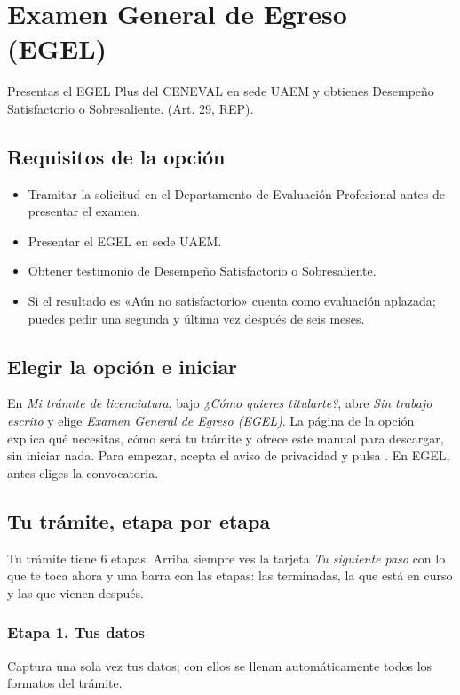 \section{Examen General de Egreso (EGEL)}
Presentas el EGEL Plus del CENEVAL en sede UAEM y obtienes Desempeño Satisfactorio o Sobresaliente. (Art. 29, REP).

\subsection{Requisitos de la opción}
\begin{itemize}
  \item Tramitar la solicitud en el Departamento de Evaluación Profesional antes de presentar el examen.
  \item Presentar el EGEL en sede UAEM.
  \item Obtener testimonio de Desempeño Satisfactorio o Sobresaliente.
  \item Si el resultado es «Aún no satisfactorio» cuenta como evaluación aplazada; puedes pedir una segunda y última vez después de seis meses.
\end{itemize}
\subsection{Elegir la opción e iniciar}
En \emph{Mi trámite de licenciatura}, bajo \emph{¿Cómo quieres titularte?}, abre \emph{Sin trabajo escrito} y elige \emph{Examen General de Egreso (EGEL)}. La página de la opción explica qué necesitas, cómo será tu trámite y ofrece este manual para descargar, sin iniciar nada. Para empezar, acepta el aviso de privacidad y pulsa . En EGEL, antes eliges la convocatoria.
\subsection{Tu trámite, etapa por etapa}
Tu trámite tiene 6 etapas. Arriba siempre ves la tarjeta \emph{Tu siguiente paso} con lo que te toca ahora y una barra con las etapas: las terminadas, la que está en curso y las que vienen después.
\subsubsection*{Etapa 1. Tus datos}
Captura una sola vez tus datos; con ellos se llenan automáticamente todos los formatos del trámite.

